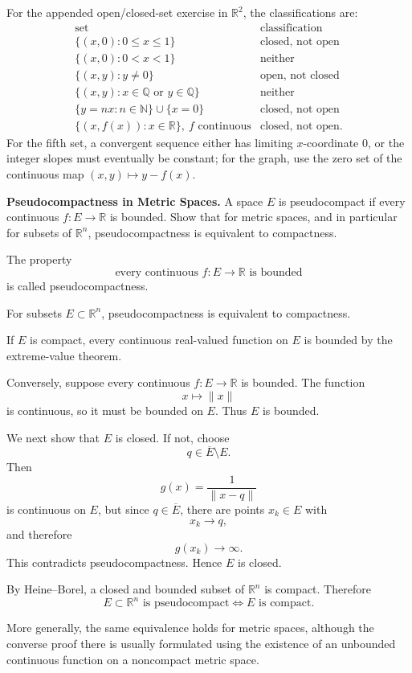 \begin{solution}
For the appended open/closed-set exercise in \(\mathbb R^2\), the classifications are:
\[
\begin{array}{c|c}
\text{set}&\text{classification}\\ \hline
\{(x,0):0\le x\le1\}&\text{closed, not open}\\
\{(x,0):0<x<1\}&\text{neither}\\
\{(x,y):y\ne0\}&\text{open, not closed}\\
\{(x,y):x\in\mathbb Q\text{ or }y\in\mathbb Q\}&\text{neither}\\
\{y=nx:n\in\mathbb N\}\cup\{x=0\}&\text{closed, not open}\\
\{(x,f(x)):x\in\mathbb R\},\ f\text{ continuous}&\text{closed, not open}.
\end{array}
\]
For the fifth set, a convergent sequence either has limiting \(x\)-coordinate \(0\), or
the integer slopes must eventually be constant; for the graph, use the zero set of the
continuous map \((x,y)\mapsto y-f(x)\).
\end{solution}


\begin{problem}[CP-II-0475]
\label{prob:cp-ii-0475}
\textbf{Pseudocompactness in Metric Spaces.}
A space \(E\) is pseudocompact if every continuous \(f:E\to\mathbb R\) is bounded. Show that for metric spaces, and in particular for subsets of \(\mathbb R^n\), pseudocompactness is equivalent to compactness.
\end{problem}

\begin{solution}
The property
\[
\text{every continuous }f:E\to\mathbb R\text{ is bounded}
\]
is called pseudocompactness.

For subsets \(E\subset\mathbb R^n\), pseudocompactness is equivalent to compactness.

If \(E\) is compact, every continuous real-valued function on \(E\) is bounded by the
extreme-value theorem.

Conversely, suppose every continuous \(f:E\to\mathbb R\) is bounded. The function
\[
x\longmapsto\|x\|
\]
is continuous, so it must be bounded on \(E\). Thus \(E\) is bounded.

We next show that \(E\) is closed. If not, choose
\[
q\in\overline E\setminus E.
\]
Then
\[
g(x)=\frac1{\|x-q\|}
\]
is continuous on \(E\), but since \(q\in\overline E\), there are points \(x_k\in E\) with
\[
x_k\to q,
\]
and therefore
\[
g(x_k)\to\infty.
\]
This contradicts pseudocompactness. Hence \(E\) is closed.

By Heine--Borel, a closed and bounded subset of \(\mathbb R^n\) is compact. Therefore
\[
\boxed{
E\subset\mathbb R^n\text{ is pseudocompact}
\iff
E\text{ is compact}.
}
\]

More generally, the same equivalence holds for metric spaces, although the converse proof
there is usually formulated using the existence of an unbounded continuous function on a
noncompact metric space.
\end{solution}



